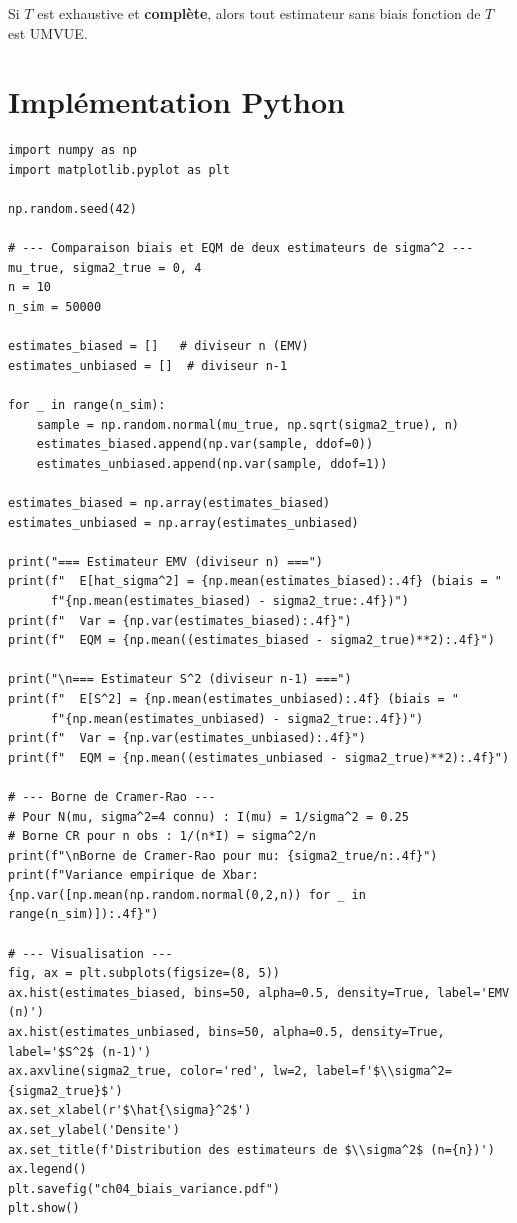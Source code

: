 \begin{theoreme}
Si $T$ est exhaustive et \textbf{compl\`ete}, alors tout estimateur sans biais fonction de $T$ est UMVUE.
\end{theoreme}

\section{Impl\'ementation Python}

\begin{python}
\begin{verbatim}
import numpy as np
import matplotlib.pyplot as plt

np.random.seed(42)

# --- Comparaison biais et EQM de deux estimateurs de sigma^2 ---
mu_true, sigma2_true = 0, 4
n = 10
n_sim = 50000

estimates_biased = []   # diviseur n (EMV)
estimates_unbiased = []  # diviseur n-1

for _ in range(n_sim):
    sample = np.random.normal(mu_true, np.sqrt(sigma2_true), n)
    estimates_biased.append(np.var(sample, ddof=0))
    estimates_unbiased.append(np.var(sample, ddof=1))

estimates_biased = np.array(estimates_biased)
estimates_unbiased = np.array(estimates_unbiased)

print("=== Estimateur EMV (diviseur n) ===")
print(f"  E[hat_sigma^2] = {np.mean(estimates_biased):.4f} (biais = "
      f"{np.mean(estimates_biased) - sigma2_true:.4f})")
print(f"  Var = {np.var(estimates_biased):.4f}")
print(f"  EQM = {np.mean((estimates_biased - sigma2_true)**2):.4f}")

print("\n=== Estimateur S^2 (diviseur n-1) ===")
print(f"  E[S^2] = {np.mean(estimates_unbiased):.4f} (biais = "
      f"{np.mean(estimates_unbiased) - sigma2_true:.4f})")
print(f"  Var = {np.var(estimates_unbiased):.4f}")
print(f"  EQM = {np.mean((estimates_unbiased - sigma2_true)**2):.4f}")

# --- Borne de Cramer-Rao ---
# Pour N(mu, sigma^2=4 connu) : I(mu) = 1/sigma^2 = 0.25
# Borne CR pour n obs : 1/(n*I) = sigma^2/n
print(f"\nBorne de Cramer-Rao pour mu: {sigma2_true/n:.4f}")
print(f"Variance empirique de Xbar:  {np.var([np.mean(np.random.normal(0,2,n)) for _ in range(n_sim)]):.4f}")

# --- Visualisation ---
fig, ax = plt.subplots(figsize=(8, 5))
ax.hist(estimates_biased, bins=50, alpha=0.5, density=True, label='EMV (n)')
ax.hist(estimates_unbiased, bins=50, alpha=0.5, density=True, label='$S^2$ (n-1)')
ax.axvline(sigma2_true, color='red', lw=2, label=f'$\\sigma^2={sigma2_true}$')
ax.set_xlabel(r'$\hat{\sigma}^2$')
ax.set_ylabel('Densite')
ax.set_title(f'Distribution des estimateurs de $\\sigma^2$ (n={n})')
ax.legend()
plt.savefig("ch04_biais_variance.pdf")
plt.show()
\end{verbatim}
\end{python}

